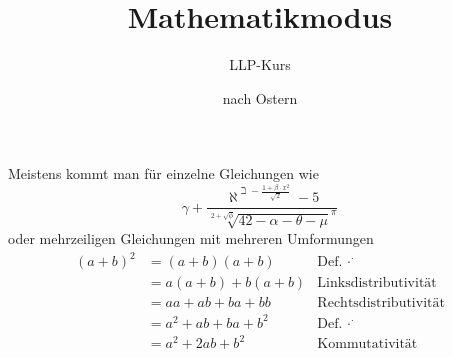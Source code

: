 \documentclass{scrartcl}
\title{Mathematikmodus}
\author{LLP-Kurs}
\date{nach Ostern}
\begin{document}
\maketitle
  Meistens kommt man für einzelne Gleichungen wie
  \begin{equation}
    \gamma +
    \frac{
      \aleph^{
        \beth -
        \frac{
          1+\beta\cdot x^2
        }{
          \sqrt{2}
        }
      }-5
    }{
      \sqrt[2+\sqrt{\phi}]{
        42-\alpha-\theta-\mu
      }^\pi
    }
  \end{equation}
  oder mehrzeiligen Gleichungen mit mehreren Umformungen
  \begin{align}
    (a+b)^2 &= ( a+b ) (a+b) & \text{Def. $\cdot^{\cdot}$} \\
            &= a (a+b) + b (a+b) & \text{Linksdistributivität} \\
            &= aa + ab + ba + bb & \text{Rechtsdistributivität} \\
            &= a^2 + ab + ba + b^2 & \text{Def. $\cdot^{\cdot}$} \\
            &= a^2 + 2 ab + b^2 & \text{Kommutativität}
  \end{align}
\end{document}
